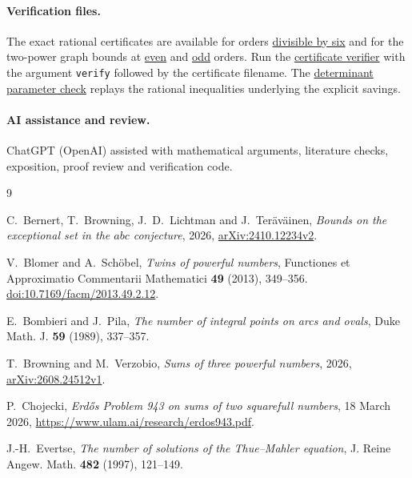 \documentclass[11pt,reqno]{amsart}
\begin{document}
\paragraph{Verification files.}
The exact rational certificates are available for orders
\href{https://raw.githubusercontent.com/royvanrijn/jacobian-research/1182d516125dc3ba7a83bac34ef0a358db1f10d8/research/arithmetic/powerful_even_order_divisible_by_six_certificate.json.gz}{divisible by six}
and for the two-power graph bounds at
\href{https://raw.githubusercontent.com/royvanrijn/jacobian-research/1182d516125dc3ba7a83bac34ef0a358db1f10d8/research/arithmetic/powerful_two_power_even_certificate.json.gz}{even}
and
\href{https://raw.githubusercontent.com/royvanrijn/jacobian-research/1182d516125dc3ba7a83bac34ef0a358db1f10d8/research/arithmetic/powerful_two_power_odd_certificate.json.gz}{odd}
orders. Run the
\href{https://raw.githubusercontent.com/royvanrijn/jacobian-research/1182d516125dc3ba7a83bac34ef0a358db1f10d8/research/arithmetic/verify_powerful_fixed_offset_constraints.py}{certificate verifier}
with the argument \texttt{verify} followed by the certificate filename.
The
\href{https://raw.githubusercontent.com/royvanrijn/jacobian-research/1182d516125dc3ba7a83bac34ef0a358db1f10d8/research/arithmetic/verify_powerful_adaptive_determinant.py}{determinant parameter check}
replays the rational inequalities underlying the explicit savings.

\paragraph{AI assistance and review.}
ChatGPT (OpenAI) assisted with mathematical arguments, literature checks,
exposition, proof review and verification code.

\begin{thebibliography}{9}

C.~Bernert, T.~Browning, J.~D.~Lichtman and J.~Ter\"av\"ainen,
\emph{Bounds on the exceptional set in the \(abc\) conjecture},
2026, \href{https://arxiv.org/abs/2410.12234v2}{arXiv:2410.12234v2}.

V.~Blomer and A.~Sch\"obel,
\emph{Twins of powerful numbers},
Functiones et Approximatio Commentarii Mathematici \textbf{49}
(2013), 349--356.
\href{https://doi.org/10.7169/facm/2013.49.2.12}{doi:10.7169/facm/2013.49.2.12}.

E.~Bombieri and J.~Pila,
\emph{The number of integral points on arcs and ovals},
Duke Math. J. \textbf{59} (1989), 337--357.

T.~Browning and M.~Verzobio,
\emph{Sums of three powerful numbers},
2026, \href{https://arxiv.org/abs/2608.24512v1}{arXiv:2608.24512v1}.

P.~Chojecki,
\emph{Erd\H{o}s Problem 943 on sums of two squarefull numbers},
18 March 2026, \url{https://www.ulam.ai/research/erdos943.pdf}.

J.-H.~Evertse,
\emph{The number of solutions of the Thue--Mahler equation},
J. Reine Angew. Math. \textbf{482} (1997), 121--149.

\end{thebibliography}
\end{document}
